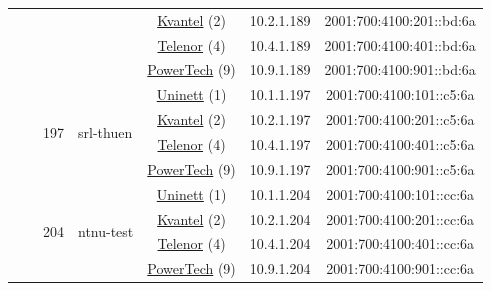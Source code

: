 \begin{small}
\begin{center}
\begin{longtable}{|c|c|c|c|c|c|c|c|}
  &  &  &  & \multicolumn{2}{|c|}{\tiny{\href{http://kvantel.no}{Kvantel} (2)}} & \tiny{10.2.1.189} & \tiny{2001:700:4100:201::bd:6a} \\* \cline{5-5}\cline{6-6}\cline{7-7}\cline{8-8}
  &  &  &  & \multicolumn{2}{|c|}{\tiny{\href{https://www.telenor.no}{Telenor} (4)}} & \tiny{10.4.1.189} & \tiny{2001:700:4100:401::bd:6a} \\* \cline{5-5}\cline{6-6}\cline{7-7}\cline{8-8}
  &  &  &  & \multicolumn{2}{|c|}{\tiny{\href{http://www.powertech.no}{PowerTech} (9)}} & \tiny{10.9.1.189} & \tiny{2001:700:4100:901::bd:6a} \\* \cline{3-3}\cline{4-4}\cline{5-5}\cline{6-6}\cline{7-7}\cline{8-8}
  &  & \multirow{4}{*}{\tiny{197}} & \multicolumn{1}{|l|}{\multirow{4}{*}{\tiny{srl-thuen}}} & \multicolumn{2}{|c|}{\tiny{\href{https://www.uninett.no}{Uninett} (1)}} & \tiny{10.1.1.197} & \tiny{2001:700:4100:101::c5:6a} \\* \cline{5-5}\cline{6-6}\cline{7-7}\cline{8-8}
  &  &  &  & \multicolumn{2}{|c|}{\tiny{\href{http://kvantel.no}{Kvantel} (2)}} & \tiny{10.2.1.197} & \tiny{2001:700:4100:201::c5:6a} \\* \cline{5-5}\cline{6-6}\cline{7-7}\cline{8-8}
  &  &  &  & \multicolumn{2}{|c|}{\tiny{\href{https://www.telenor.no}{Telenor} (4)}} & \tiny{10.4.1.197} & \tiny{2001:700:4100:401::c5:6a} \\* \cline{5-5}\cline{6-6}\cline{7-7}\cline{8-8}
  &  &  &  & \multicolumn{2}{|c|}{\tiny{\href{http://www.powertech.no}{PowerTech} (9)}} & \tiny{10.9.1.197} & \tiny{2001:700:4100:901::c5:6a} \\* \cline{3-3}\cline{4-4}\cline{5-5}\cline{6-6}\cline{7-7}\cline{8-8}
  &  & \multirow{4}{*}{\tiny{204}} & \multicolumn{1}{|l|}{\multirow{4}{*}{\tiny{ntnu-test}}} & \multicolumn{2}{|c|}{\tiny{\href{https://www.uninett.no}{Uninett} (1)}} & \tiny{10.1.1.204} & \tiny{2001:700:4100:101::cc:6a} \\* \cline{5-5}\cline{6-6}\cline{7-7}\cline{8-8}
  &  &  &  & \multicolumn{2}{|c|}{\tiny{\href{http://kvantel.no}{Kvantel} (2)}} & \tiny{10.2.1.204} & \tiny{2001:700:4100:201::cc:6a} \\* \cline{5-5}\cline{6-6}\cline{7-7}\cline{8-8}
  &  &  &  & \multicolumn{2}{|c|}{\tiny{\href{https://www.telenor.no}{Telenor} (4)}} & \tiny{10.4.1.204} & \tiny{2001:700:4100:401::cc:6a} \\* \cline{5-5}\cline{6-6}\cline{7-7}\cline{8-8}
  &  &  &  & \multicolumn{2}{|c|}{\tiny{\href{http://www.powertech.no}{PowerTech} (9)}} & \tiny{10.9.1.204} & \tiny{2001:700:4100:901::cc:6a} \\* \cline{3-3}\cline{4-4}\cline{5-5}\cline{6-6}\cline{7-7}\cline{8-8}

\end{longtable}
\end{center}
\end{small}
